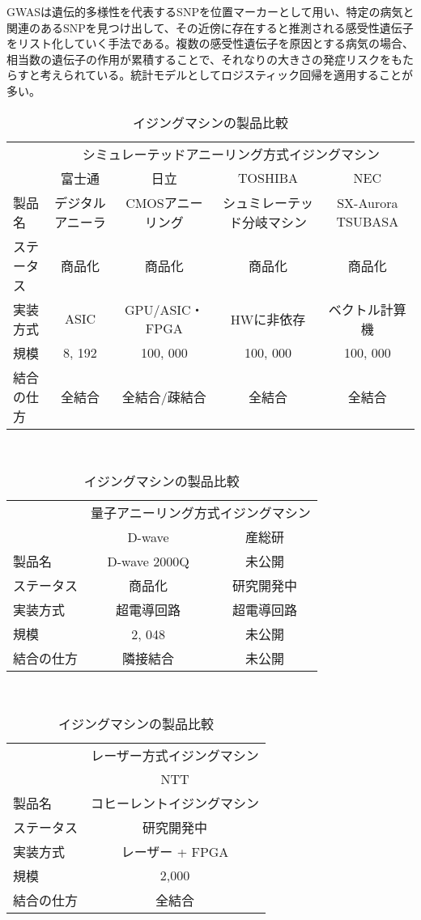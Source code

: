 GWASは遺伝的多様性を代表するSNPを位置マーカーとして用い、特定の病気と関連のあるSNPを見つけ出して、その近傍に存在すると推測される感受性遺伝子をリスト化していく手法である。複数の感受性遺伝子を原因とする病気の場合、相当数の遺伝子の作用が累積することで、それなりの大きさの発症リスクをもたらすと考えられている。統計モデルとしてロジスティック回帰を適用することが多い\cite{duverle2015privacy}。

\begin{table}[H]
	\caption{イジングマシンの製品比較}
	\label{tb:ising_machine}
	\begin{minipage}{0.3\hsize}
		\begin{tabular}{lcccc}
			&\multicolumn{4}{c}{シミュレーテッドアニーリング方式イジングマシン} \\
			& 富士通 & 日立 & TOSHIBA & NEC\\
			\hline\hline
			製品名 & デジタルアニーラ & CMOSアニーリング & シュミレーテッド分岐マシン & SX-Aurora TSUBASA\\
			ステータス & 商品化 & 商品化 & 商品化 & 商品化\\
			実装方式 & ASIC & GPU/ASIC・FPGA & HWに非依存 & ベクトル計算機\\
			規模 & 8, 192 & 100, 000 & 100, 000 & 100, 000 \\
			結合の仕方 & 全結合 & 全結合/疎結合 & 全結合 & 全結合\\
			\hline
		\end{tabular}
	\end{minipage}
	\vspace{0.5in} \\
	\begin{minipage}{0.3\hsize}
		\begin{tabular}{lcc}
			&\multicolumn{2}{c}{量子アニーリング方式イジングマシン} \\
			& D-wave & 産総研 \\
			\hline\hline
			製品名 & D-wave 2000Q & 未公開\\
			ステータス & 商品化 & 研究開発中\\
			実装方式 & 超電導回路 & 超電導回路\\
			規模 & 2, 048 & 未公開\\
			結合の仕方 & 隣接結合 & 未公開\\
			\hline
		\end{tabular}
	\end{minipage}
	\vspace{0.5in} \\
	\begin{minipage}{0.3\hsize}
		\centering
		\begin{tabular}{lc}
			&レーザー方式イジングマシン \\
			& NTT\\
			\hline\hline
			製品名 & コヒーレントイジングマシン\\
			ステータス & 研究開発中\\
			実装方式 & レーザー + FPGA\\
			規模 & 2,000\\
			結合の仕方 & 全結合\\
			\hline
		\end{tabular}
	\end{minipage}
\end{table}


